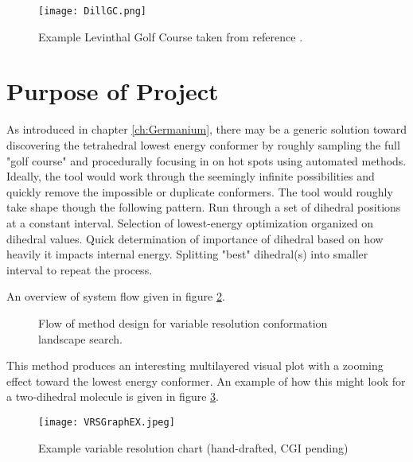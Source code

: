 \begin{figure}
	
	\centering
	
	\texttt{[image: DillGC.png]}
	
	\caption{Example Levinthal Golf Course taken from reference .}
	
	\label{fig:DillGC}
	
\end{figure}


\section{Purpose of Project}

As introduced in chapter \ref{ch:Germanium}, there may be a generic solution toward discovering the tetrahedral lowest energy conformer by roughly sampling the full "golf course" and procedurally focusing in on hot spots using automated methods.
Ideally, the tool would work through the seemingly infinite possibilities and quickly remove the impossible or duplicate conformers.
The tool would roughly take shape though the following pattern.
Run through a set of dihedral positions at a constant interval. 
Selection of lowest-energy optimization organized on dihedral values. 
Quick determination of importance of dihedral based on how heavily it impacts internal energy. 
Splitting "best" dihedral(s) into smaller interval to repeat the process. 

An overview of system flow given in figure \ref{fig:VRSDesign}.
\begin{figure}
	\centering 
	\caption{Flow of method design for variable resolution conformation landscape search.}
	\label{fig:VRSDesign}
	
\end{figure}
This method produces an interesting multilayered visual plot with a zooming effect toward the lowest energy conformer.
An example of how this might look for a two-dihedral molecule is given in figure \ref{fig:variableResolutionSample}.

\begin{figure}
	
	\centering
	
	\texttt{[image: VRSGraphEX.jpeg]}
	
	\caption{Example variable resolution chart (hand-drafted, CGI pending)}
	
	\label{fig:variableResolutionSample}
		
\end{figure}

